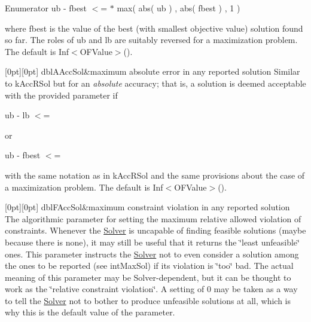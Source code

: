\begin{DoxyEnumFields}{Enumerator}
ub -\/ fbest $<$=  $\ast$ max( abs( ub ) , abs( fbest ) , 1 )

where fbest is the value of the best (with smallest objective value) solution found so far. The roles of ub and lb are suitably reversed for a maximization problem. The default is Inf$<$\+O\+F\+Value$>$(). \\
\hline

[0pt][0pt]{}\mbox{\label{class_s_m_spp__di__unipi__it_1_1_solver_ace6215148d1e3c41a8844f6d692ee132a61233350cae4834386fdc2f6b35de36d}} 
dbl\+A\+Acc\+Sol&maximum absolute error in any reported solution Similar to k\+Acc\+R\+Sol but for an {\itshape absolute} accuracy; that is, a solution is deemed acceptable with the provided parameter  if

ub -\/ lb $<$= 

or

ub -\/ fbest $<$= 

with the same notation as in k\+Acc\+R\+Sol and the same provisions about the case of a maximization problem. The default is Inf$<$\+O\+F\+Value$>$(). \\
\hline

[0pt][0pt]{}\mbox{\label{class_s_m_spp__di__unipi__it_1_1_solver_ace6215148d1e3c41a8844f6d692ee132aa3e286dbe7477468d81258bd410d7ca6}} 
dbl\+F\+Acc\+Sol&maximum constraint violation in any reported solution The algorithmic parameter for setting the maximum relative allowed violation of constraints. Whenever the \mbox{\hyperlink{class_s_m_spp__di__unipi__it_1_1_solver}{Solver}} is uncapable of finding feasible solutions (maybe because there is none), it may still be useful that it returns the \char`\"{}least unfeasible\char`\"{} ones. This parameter instructs the \mbox{\hyperlink{class_s_m_spp__di__unipi__it_1_1_solver}{Solver}} not to even consider a solution among the ones to be reported (see int\+Max\+Sol) if its violation is \char`\"{}too\char`\"{} bad. The actual meaning of this parameter may be Solver-\/dependent, but it can be thought to work as the \char`\"{}relative constraint violation\char`\"{}. A setting of 0 may be taken as a way to tell the \mbox{\hyperlink{class_s_m_spp__di__unipi__it_1_1_solver}{Solver}} not to bother to produce unfeasible solutions at all, which is why this is the default value of the parameter. \\
\hline


\end{DoxyEnumFields}

